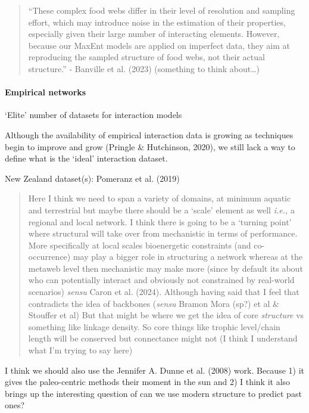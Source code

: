 \documentclass[
]{agujournal2019}
\let\oldparagraph\paragraph
\renewcommand{\paragraph}[1]{\oldparagraph{#1}\mbox{}}
\begin{document}
\begin{quote}
``These complex food webs differ in their level of resolution and
sampling effort, which may introduce noise in the estimation of their
properties, especially given their large number of interacting elements.
However, because our MaxEnt models are applied on imperfect data, they
aim at reproducing the sampled structure of food webs, not their actual
structure.'' - Banville et al. (2023) (something to think about\ldots)
\end{quote}

\paragraph{Empirical networks}\label{empirical-networks}

`Elite' number of datasets for interaction models

Although the availability of empirical interaction data is growing as
techniques begin to improve and grow (Pringle \& Hutchinson, 2020), we
still lack a way to define what is the `ideal' interaction dataset.

New Zealand dataset(s): Pomeranz et al. (2019)

\begin{quote}
Here I think we need to span a variety of domains, at minimum aquatic
and terrestrial but maybe there should be a `scale' element as well
\emph{i.e.,} a regional and local network. I think there is going to be
a `turning point' where structural will take over from mechanistic in
terms of performance. More specifically at local scales bioenergetic
constraints (and co-occurrence) may play a bigger role in structuring a
network whereas at the metaweb level then mechanistic may make more
(since by default its about who can potentially interact and obviously
not constrained by real-world scenarios) \emph{sensu} Caron et al.
(2024). Although having said that I feel that contradicts the idea of
backbones (\emph{sensu} Bramon Mora (sp?) et al \& Stouffer et al) But
that might be where we get the idea of core \emph{structure} vs
something like linkage density. So core things like trophic level/chain
length will be conserved but connectance might not (I think I understand
what I'm trying to say here)
\end{quote}

I think we should also use the Jennifer A. Dunne et al. (2008) work.
Because 1) it gives the paleo-centric methods their moment in the sun
and 2) I think it also brings up the interesting question of can we use
modern structure to predict past ones?
\end{document}
